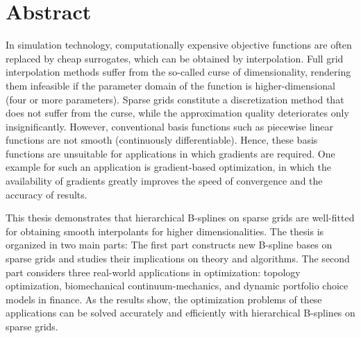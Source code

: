 
\printornamentsfalse

\section*{Abstract}

In simulation technology, computationally expensive objective functions
are often replaced by cheap surrogates,
which can be obtained by interpolation.
Full grid interpolation methods suffer from the
so-called curse of dimensionality,
rendering them infeasible if the parameter domain of the function
is higher-dimensional (four or more parameters).
Sparse grids constitute a discretization method that does not suffer from the
curse, while the approximation quality deteriorates only insignificantly.
However, conventional basis functions such as piecewise linear functions
are not smooth (continuously differentiable).
Hence, these basis functions are unsuitable for applications
in which gradients are required.
One example for such an application is gradient-based optimization,
in which the availability of gradients greatly improves the speed of
convergence and the accuracy of results.

This thesis demonstrates that hierarchical B-splines on sparse grids are
well-fitted for obtaining smooth interpolants for higher dimensionalities.
The thesis is organized in two main parts:
The first part constructs new B-spline bases on sparse grids and studies
their implications on theory and algorithms.
The second part considers three real-world applications in optimization:
topology optimization, biomechanical continuum-mechanics, and
dynamic portfolio choice models in finance.
As the results show, the optimization problems of these applications
can be solved accurately and efficiently with hierarchical B-splines on
sparse grids.

\newpage

